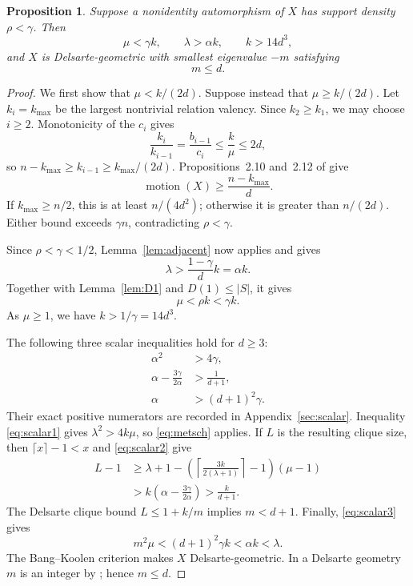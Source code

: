 \documentclass[11pt]{amsart}
\newtheorem{proposition}[theorem]{Proposition}
\theoremstyle{definition}
\newcommand{\mot}{\operatorname{motion}}
\newcommand{\gam}{\gamma}
\begin{document}
\begin{proposition}\label{prop:structure}
Suppose a nonidentity automorphism of $X$ has support density $\rho<\gam$.  Then
\begin{equation}\label{eq:structdata}
 \mu<\gam k,
 \qquad
 \lambda>\alpha k,
 \qquad
 k>14d^3,
\end{equation}
and $X$ is Delsarte-geometric with smallest eigenvalue $-m$ satisfying
\begin{equation}\label{eq:mleqd}
 m\le d.
\end{equation}
\end{proposition}

\begin{proof}
We first show that $\mu<k/(2d)$.  Suppose instead that $\mu\ge k/(2d)$.  Let $k_i=k_{\max}$ be the largest nontrivial relation valency.  Since $k_2\ge k_1$, we may choose $i\ge2$.  Monotonicity of the $c_i$ gives
\[
 \frac{k_i}{k_{i-1}}=\frac{b_{i-1}}{c_i}\le\frac{k}{\mu}\le2d,
\]
so $n-k_{\max}\ge k_{i-1}\ge k_{\max}/(2d)$.  Propositions~2.10 and~2.12 of \cite{PS} give
\[
 \mot(X)\ge\frac{n-k_{\max}}d.
\]
If $k_{\max}\ge n/2$, this is at least $n/(4d^2)$; otherwise it is greater than $n/(2d)$.  Either bound exceeds $\gam n$, contradicting $\rho<\gam$.

Since $\rho<\gam<1/2$, Lemma~\ref{lem:adjacent} now applies and gives
\[
 \lambda>\frac{1-\gam}{d}k=\alpha k.
\]
Together with Lemma~\ref{lem:D1} and $D(1)\le|S|$, it gives
\[
 \mu<\rho k<\gam k.
\]
As $\mu\ge1$, we have $k>1/\gam=14d^3$.

The following three scalar inequalities hold for $d\ge3$:
\begin{align}
 \alpha^2&>4\gam,\label{eq:scalar1}\\
 \alpha-\frac{3\gam}{2\alpha}&>\frac1{d+1},\label{eq:scalar2}\\
 \alpha&>(d+1)^2\gam.\label{eq:scalar3}
\end{align}
Their exact positive numerators are recorded in Appendix~\ref{sec:scalar}.  Inequality \eqref{eq:scalar1} gives $\lambda^2>4k\mu$, so \eqref{eq:metsch} applies.  If $L$ is the resulting clique size, then $\lceil x\rceil-1<x$ and \eqref{eq:scalar2} give
\begin{align*}
 L-1
 &\ge \lambda+1-
 \left(\left\lceil\frac{3k}{2(\lambda+1)}\right\rceil-1\right)(\mu-1)\\
 &>k\left(\alpha-\frac{3\gam}{2\alpha}\right)
 >\frac{k}{d+1}.
\end{align*}
The Delsarte clique bound $L\le1+k/m$ implies $m<d+1$.  Finally, \eqref{eq:scalar3} gives
\[
 m^2\mu<(d+1)^2\gam k<\alpha k<\lambda.
\]
The Bang--Koolen criterion \cite[Proposition~2.5]{PS} makes $X$ Delsarte-geometric.  In a Delsarte geometry $m$ is an integer by \cite[Lemma~2.3]{PS}; hence $m\le d$.
\end{proof}
\end{document}
